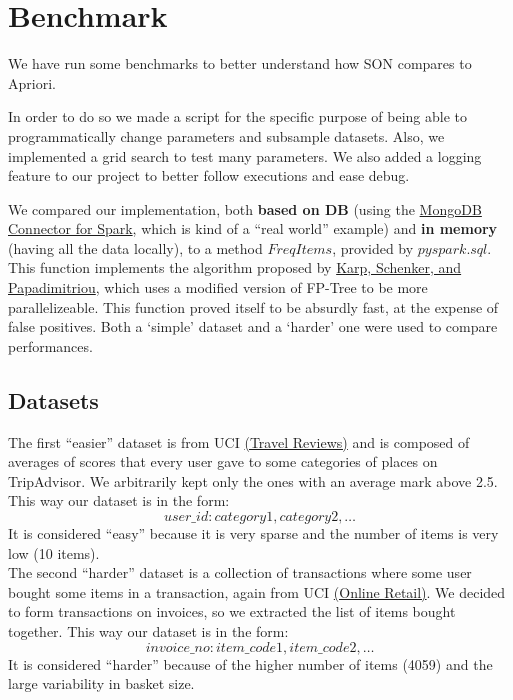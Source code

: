 \documentclass[a4paper]{article}
\begin{document}
	\section{Benchmark}
	We have run some benchmarks to better understand how SON compares to Apriori.
	
	In order to do so we made a script for the specific purpose of being able to programmatically change parameters and subsample datasets.
	Also, we implemented a grid search to test many parameters. We also added a logging feature to our project to better follow executions and ease debug.
	
	We compared our implementation, both \textbf{based on DB} (using the \href{https://www.mongodb.com/docs/spark-connector/current/}{MongoDB Connector for Spark}, which is kind of a ``real world'' example)
	and \textbf{in memory} (having all the data locally), to a method $FreqItems$, provided by $pyspark.sql$. 
	This function implements the algorithm proposed by \href{https://doi.org/10.1145/762471.762473}{Karp, Schenker, and Papadimitriou}, which uses a modified version of FP-Tree to be more parallelizeable. 
	This function proved itself to be absurdly fast, at the expense of false positives.
	Both a  `simple' dataset and a `harder' one were used to compare performances.

	\subsection{Datasets}
	The first ``easier'' dataset is from UCI \href{https://archive.ics.uci.edu/ml/datasets/Travel+Reviews#}{(Travel Reviews)} and is composed of averages of scores that every user gave to some
	categories of places on TripAdvisor. We arbitrarily kept only the ones with an average mark above 2.5. This way our dataset is in the form:
	\[ user\_id: category1, category2, \ldots \]
	It is considered ``easy'' because it is very sparse and the number of items is very low (10 items).\\

	The second ``harder'' dataset is a collection of transactions where some user bought some items in a transaction, again from UCI \href{https://archive.ics.uci.edu/ml/datasets/online+retail}{(Online Retail)}.
	We decided to form transactions on invoices, so we extracted the list of items bought together.
	This way our dataset is in the form:
	\[ invoice\_no: item\_code1, item\_code2, \ldots \]
	It is considered ``harder'' because of the higher number of items (4059) and the large variability in basket size.\\
\end{document}
